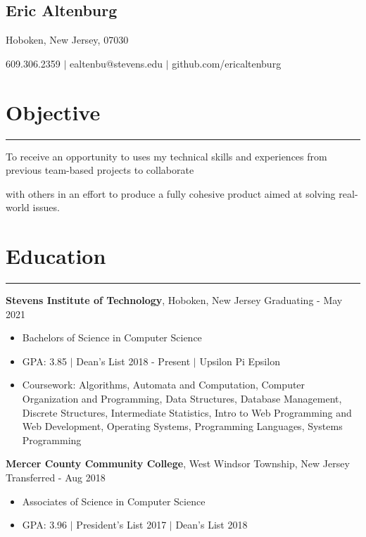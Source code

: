 \documentclass[10pt]{article}
\newcommand{\name}[1]{\begin{center}\section*{\huge #1}\end{center}}
\newcommand{\topinfo}[1]{\begin{center}\vspace{-0.15cm}#1\vspace{-0.15cm}\end{center}}
\newcommand{\resumesection}[1]{\vspace{-0.2cm}\section*{#1}\vspace{-0.2cm}\hrule\vspace{0.2cm}}
\begin{document}
\name{Eric Altenburg}
\topinfo{Hoboken, New Jersey, 07030}

\topinfo{609.306.2359 $\vert$ ealtenbu@stevens.edu $\vert$ github.com/ericaltenburg}

\resumesection{Objective}

To receive an opportunity to uses my technical skills and experiences from previous team-based projects to collaborate 

with others in an effort to produce a fully cohesive product aimed at solving real-world issues.





\resumesection{Education}
\textbf{Stevens Institute of Technology}, Hoboken, New Jersey \hfill Graduating - May 2021
\begin{itemize}
	\item Bachelors of Science in Computer Science
	\item GPA: 3.85 $\vert$ Dean's List 2018 - Present $\vert$ Upsilon Pi Epsilon 
	\item Coursework: Algorithms, Automata and Computation, Computer Organization and Programming, Data Structures, Database Management, Discrete Structures, Intermediate Statistics, Intro to Web Programming and Web Development, Operating Systems, Programming Languages, Systems Programming
\end{itemize}

\textbf{Mercer County Community College}, West Windsor Township, New Jersey \hfill Transferred - Aug 2018
\begin{itemize}
	\item Associates of Science in Computer Science
	\item GPA: 3.96 $\vert$ President's List 2017 $\vert$ Dean's List 2018
\end{itemize}
\end{document}
